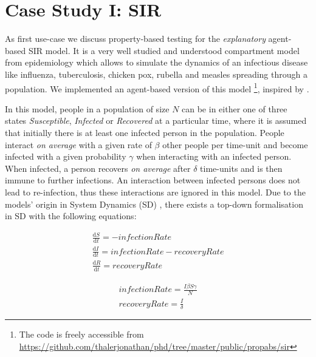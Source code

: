 \section{Case Study I: SIR}
\label{sec:case_SIR}
As first use-case we discuss property-based testing for the \textit{explanatory} agent-based SIR model. It is a very well studied and understood compartment model from epidemiology \cite{kermack_contribution_1927} which allows to simulate the dynamics of an infectious disease like influenza, tuberculosis, chicken pox, rubella and measles spreading through a population. We implemented an agent-based version of this model \footnote{The code is freely accessible from \url{https://github.com/thalerjonathan/phd/tree/master/public/propabs/sir}}, inspired by \cite{macal_agent-based_2010}.

In this model, people in a population of size $N$ can be in either one of three states \textit{Susceptible}, \textit{Infected} or \textit{Recovered} at a particular time, where it is assumed that initially there is at least one infected person in the population. People interact \textit{on average} with a given rate of $\beta$ other people per time-unit and become infected with a given probability $\gamma$ when interacting with an infected person. When infected, a person recovers \textit{on average} after $\delta$ time-units and is then immune to further infections. An interaction between infected persons does not lead to re-infection, thus these interactions are ignored in this model. Due to the models' origin in System Dynamics (SD) \cite{porter_industrial_1962}, there exists a top-down formalisation in SD with the following equations:

\begin{equation}
\begin{aligned}
\frac{\mathrm d S}{\mathrm d t} = -infectionRate \\
\frac{\mathrm d I}{\mathrm d t} = infectionRate - recoveryRate \\
\frac{\mathrm d R}{\mathrm d t} = recoveryRate 
\end{aligned}
\end{equation}

\begin{equation}
\begin{aligned}
infectionRate = \frac{I \beta S \gamma}{N} \\
recoveryRate = \frac{I}{\delta} 
\end{aligned}
\end{equation}

